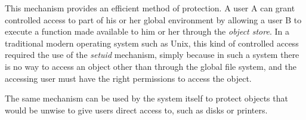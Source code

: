 This mechanism provides an efficient method of protection.  A user A
can grant controlled access to part of his or her global environment
by allowing a user B to execute a function made available to him or
her through the \emph{object store}.  
In a traditional modern operating system such as Unix, this kind of
controlled access required the use of the \emph{setuid} mechanism,
simply because in such a system there is no way to access an object
other than through the global file system, and the accessing user must
have the right permissions to access the object. 

The same mechanism can be used by the system itself to protect objects
that would be unwise to give users direct access to, such as disks or
printers. 


